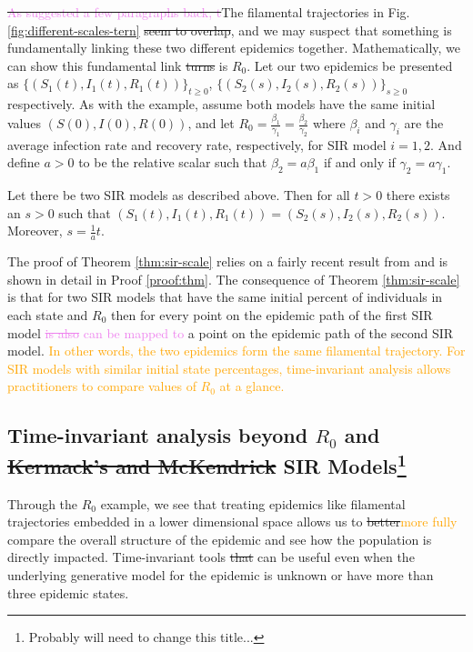 \documentclass[
  shortnames]{jss}
\begin{document}
\sout{\textcolor{violet}{As suggested a few paragraphs back, t}}The
filamental trajectories in Fig. \ref{fig:different-scales-tern}
\sout{seem to overlap}, and we may suspect that something is
fundamentally linking these two different epidemics together.
Mathematically, we can show this fundamental link \sout{turns} is
\(R_0\). Let our two epidemics be presented as
\(\{(S_1(t), I_1(t), R_1(t))\}_{t\geq0}\),
\(\{(S_2(s), I_2(s), R_2(s))\}_{s \geq 0}\) respectively. As with the
example, assume both models have the same initial values
\((S(0), I(0), R(0))\), and let
\(R_0 =\frac{\beta_1}{\gamma_1} = \frac{\beta_2}{\gamma_2}\) where
\(\beta_i\) and \(\gamma_i\) are the average infection rate and recovery
rate, respectively, for SIR model \(i=1, 2\). And define \(a>0\) to be
the relative scalar such that \(\beta_2 = a \beta_1\) if and only if
\(\gamma_2 = a \gamma_1\).

\begin{theorem}\label{thm:sir-scale}
Let there be two SIR models as described above.  Then for all $t > 0$ there exists an $s>0$ such that $(S_1(t), I_1(t), R_1(t)) = (S_2(s), I_2(s), R_2(s))$.  Moreover, $s = \frac{1}{a}t$.
\end{theorem}

The proof of Theorem \ref{thm:sir-scale} relies on a fairly recent
result from \cite{Harko2014} and is shown in detail in Proof
\ref{proof:thm}. The consequence of Theorem \ref{thm:sir-scale} is that
for two SIR models that have the same initial percent of individuals in
each state and \(R_0\) then for every point on the epidemic path of the
first SIR model \textcolor{violet}{\sout{is also} can be mapped to} a
point on the epidemic path of the second SIR model.
\textcolor{orange}{In other words, the two epidemics form the same filamental trajectory. For SIR models with similar initial state percentages, time-invariant analysis allows practitioners to compare values of $R_0$ at a glance.}

\subsection[Beyond R0 and SIR]{Time-invariant analysis beyond \(R_0\)
and \sout{Kermack’s and McKendrick} SIR
Models\footnote{Probably will need to change this title...}}\label{sec:beyond-r0-sir}

Through the \(R_0\) example, we see that treating epidemics like
filamental trajectories embedded in a lower dimensional space allows us
to \sout{better}\textcolor{orange}{more fully} compare the overall
structure of the epidemic and see how the population is directly
impacted. Time-invariant tools \sout{that} can be useful even when the
underlying generative model for the epidemic is unknown or have more
than three epidemic states.
\end{document}
